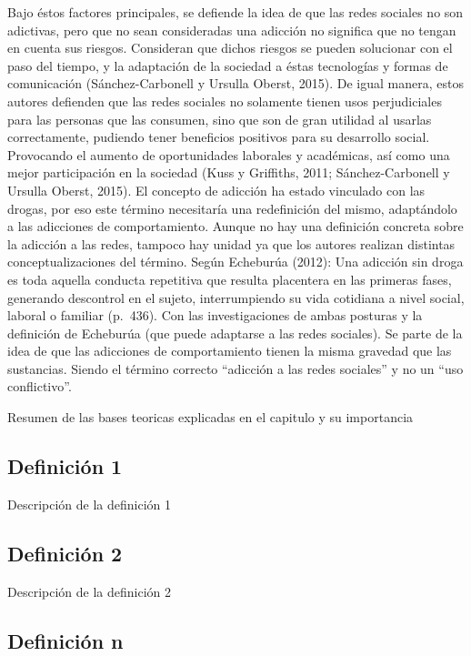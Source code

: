 \documentclass[oneside,11pt]{Latex/Classes/PhDthesisPSnPDF}
\begin{document}
Bajo éstos factores principales, se defiende la idea de que las redes
sociales no son adictivas, pero que no sean consideradas una adicción no
significa que no tengan en cuenta sus riesgos. Consideran que dichos
riesgos se pueden solucionar con el paso del tiempo, y la adaptación de
la sociedad a éstas tecnologías y formas de comunicación
(Sánchez-Carbonell y Ursulla Oberst, 2015). De igual manera, estos
autores defienden que las redes sociales no solamente tienen usos
perjudiciales para las personas que las consumen, sino que son de gran
utilidad al usarlas correctamente, pudiendo tener beneficios positivos
para su desarrollo social. Provocando el aumento de oportunidades
laborales y académicas, así como una mejor participación en la sociedad
(Kuss y Griffiths, 2011; Sánchez-Carbonell y Ursulla Oberst, 2015). El
concepto de adicción ha estado vinculado con las drogas, por eso este
término necesitaría una redefinición del mismo, adaptándolo a las
adicciones de comportamiento. Aunque no hay una definición concreta
sobre la adicción a las redes, tampoco hay unidad ya que los autores
realizan distintas conceptualizaciones del término. Según Echeburúa
(2012): Una adicción sin droga es toda aquella conducta repetitiva que
resulta placentera en las primeras fases, generando descontrol en el
sujeto, interrumpiendo su vida cotidiana a nivel social, laboral o
familiar (p.~436). Con las investigaciones de ambas posturas y la
definición de Echeburúa (que puede adaptarse a las redes sociales). Se
parte de la idea de que las adicciones de comportamiento tienen la misma
gravedad que las sustancias. Siendo el término correcto ``adicción a las
redes sociales'' y no un ``uso conflictivo''.

Resumen de las bases teoricas explicadas en el capitulo y su
importancia~

\subsection{Definición 1}

Descripción de la definición 1\\

\subsection{Definición 2}

Descripción de la definición 2\\

\subsection{Definición n}
\end{document}
